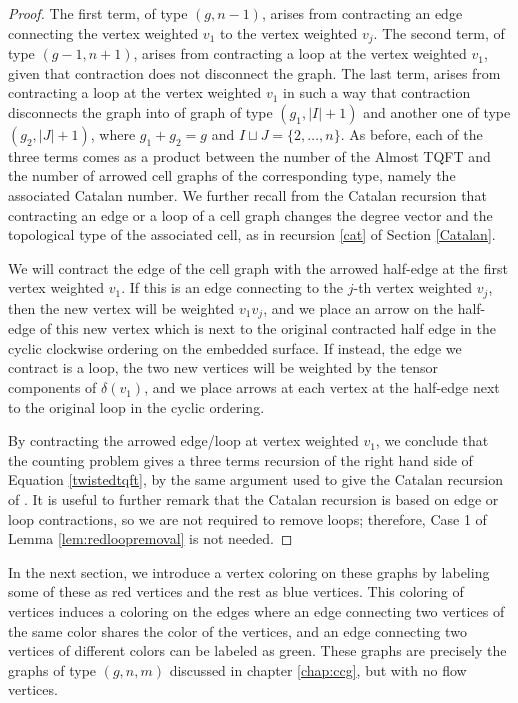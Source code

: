 \documentclass{amsart}
\theoremstyle{definition}
\begin{document}
\begin{proof}
	The first term, of type $(g, n-1)$, arises from contracting an edge connecting the vertex weighted $v_1$ to the vertex weighted $v_j$. The second term, of type $(g-1,n+1)$, arises from contracting a loop at the vertex weighted $v_1$, given that contraction does not disconnect the graph. The last term, arises from contracting a loop at the vertex weighted $v_1$ in such a way that contraction disconnects the graph into of graph of type $(g_1, |I|+1)$ and another one of type $(g_2, |J|+1)$, where $g_1+g_2=g$ and 
	$I \sqcup J=\{2, \ldots, n\}$. As before, each of the three terms comes as a product between the number of the Almost TQFT and the number of arrowed cell graphs of the corresponding type, namely the associated Catalan number. We further recall from the Catalan recursion that contracting an edge or a loop of a cell graph changes the degree vector and the topological type of the associated cell, as in recursion \ref{cat} of  Section \ref{Catalan}.
	
	We will contract the edge of the cell graph with the arrowed half-edge at the first vertex weighted $v_1$. If this is an edge connecting to the $j$-th vertex weighted $v_j$, then the new vertex will be weighted $v_1v_j$, and we place an arrow on the half-edge of this new vertex which is next to the original contracted half edge in the cyclic clockwise ordering on the embedded surface. If instead, the edge we contract is a loop, the two new vertices will be weighted by the tensor components of $\delta(v_1)$, and we place arrows at each vertex at the half-edge next to the original loop in the cyclic ordering.

	 By contracting the arrowed edge/loop at vertex weighted $v_1$, we conclude that the counting problem gives a three terms recursion of the right hand side of Equation \ref{twistedtqft}, by the same argument used to give the Catalan recursion of \cite{DM_invitation, DM_ribbon}. It is useful to further remark that the Catalan recursion is based on edge or loop contractions, so we are not required to remove loops; therefore, Case 1 of Lemma \ref{lem:redloopremoval} is not needed.

	
\end{proof}



 In the next section, we introduce a vertex coloring on these graphs by labeling some of these as red vertices and the rest as blue vertices. This coloring of vertices induces a coloring on the edges where an edge connecting two vertices of the same color shares the color of the vertices, and an edge connecting two vertices of different colors can be labeled as green. These graphs are precisely the graphs of type $(g,n,m)$ discussed in chapter \ref{chap:ccg}, but with no flow vertices.
\end{document}
